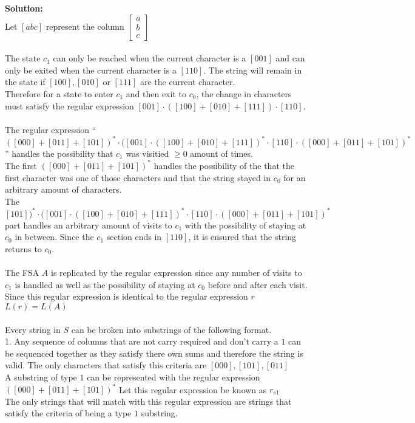 \documentclass[11pt]{article}
\begin{document}
\begin{enumerate}
\begin{solution}
{\bf Solution:}\\
Let $[abc]$ represent the column $ \left [ \begin{array}{c}a\\b\\c \end{array}\right ]$\\\\
The state $c_1$ can only be reached when the current character is a $[001]$ and can only be exited when the current character is a $[110]$. The string will remain in the state if $[100], [010]$ or $[111]$ are the current character.\\
Therefore for a state to enter $c_1$ and then exit to $c_0$, the change in characters must satisfy the regular expression $[001] \cdot ([100] + [010] + [111])\cdot [110]$.\\\\
The regular expression ``$([000] + [011] + [101])^*\cdot ([001]\cdot ([100] + [010] + [111])^* \cdot [110]\cdot ([000] + [011] + [101])^*$'' handles the possibility that $c_1$ was visitied $\ge 0$ amount of times.\\
The first $([000] + [011] + [101])^*$ handles the possibility of the that the first character was one of those characters and that the string stayed in $c_0$ for an arbitrary amount of characters.\\
The $[101])^*\cdot ([001]\cdot ([100] + [010] + [111])^* \cdot [110]\cdot ([000] + [011] + [101])^*$ part handles an arbitrary amount of visits to $c_1$ with the possibility of staying at $c_0$ in between. Since the $c_1$ section ends in $[110]$, it is ensured that the string returns to $c_0$.\\\\
The FSA $A$ is replicated by the regular expression since any number of visits to $c_1$ is handled as well as the possibility of staying at $c_0$ before and after each visit.\\
Since this regular expression is identical to the regular expression $r$\\
$L(r) = L(A)$ \\\\

Every string in $S$ can be broken into substrings of the following format.\\

1. Any sequence of columns that are not carry required and don't carry a $1$ can be sequenced together as they satisfy there own sums and therefore the string is valid. The only characters that satisfy this criteria are $[000], [101], [011]$\\
A substring of type $1$ can be represented with the regular expression\\
$([000] + [011] + [101])^*$ Let this regular expression be known as $r_{s1}$\\
The only strings that will match with this regular expression are strings that satisfy the criteria of being a type $1$ substring.\\


\end{solution}
\end{enumerate}
\end{document}
